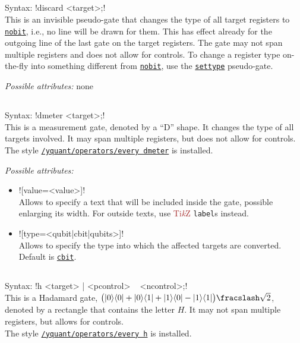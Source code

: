 \documentclass{scrartcl}
\def\TikZ{\textcolor{brown}{Ti\textit kZ}}
\def\gate#1{\hyperref[gate:#1]{\texttt{#1}}}
\def\style#1{\hyperref[style:#1]{\texttt{#1}}}
\def\ketbra#1#2{\ket{#1}\!\bra{#2}}
\begin{document}
      \subsection{\texorpdfstring{}{discard}}\label{gate:discard}
         Syntax: \yquant!discard <target>;! \\
         This is an invisible pseudo\hyp gate that changes the type of all target registers to \gate{nobit}, i.e., no line will be drawn for them.
         This has effect already for the outgoing line of the last gate on the target registers.
         The gate may not span multiple registers and does not allow for controls.
         To change a register type on\hyp the\hyp fly into something different from \gate{nobit}, use the \gate{settype} pseudo\hyp gate.

         \emph{Possible attributes:} none

      \subsection{\texorpdfstring{}{dmeter}}\label{gate:dmeter}
         Syntax: \yquant!dmeter <target>;! \\
         This is a measurement gate, denoted by a ``D'' shape.
         It changes the type of all targets involved.
         It may span multiple registers, but does not allow for controls.
         The style \style{/yquant/operators/every dmeter} is installed.

         \emph{Possible attributes:}
         \begin{itemize}
            \item \yquant![value=<value>]! \\
               Allows to specify a text that will be included inside the gate, possible enlarging its width.
               For outside texts, use \TikZ{} \texttt{label}s instead.
            \item \yquant![type=<qubit|cbit|qubits>]! \\
               Allows to specify the type into which the affected targets are converted.
               Default is \gate{cbit}.
         \end{itemize}

      \subsection{\texorpdfstring{}{h}}\label{gate:h}
         Syntax: \yquant!h <target> | <pcontrol> ~ <ncontrol>;! \\
         This is a Hadamard gate, $\bigl( \ketbra00 + \ketbra01 + \ketbra10 - \ketbra11 \bigr) \fracslash \sqrt2$, denoted by a rectangle that contains the letter $H$.
         It may not span multiple registers, but allows for controls. \\
         The style \style{/yquant/operators/every h} is installed.
\end{document}
